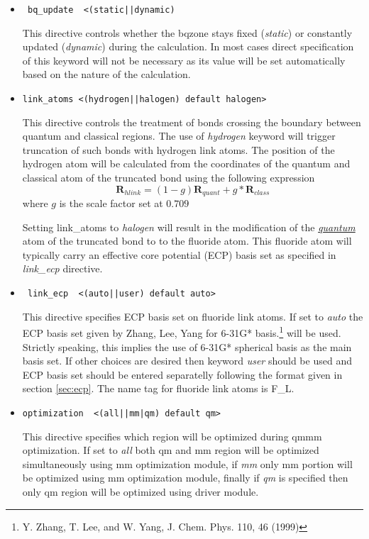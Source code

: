 \begin{itemize}
\item
\begin{verbatim}
 bq_update  <(static||dynamic)
\end{verbatim}
This directive controls whether the bqzone stays fixed ({\it static}) or constantly 
updated ({\it dynamic}) during the calculation. In most cases direct specification of this keyword
will not be necessary as its value will be set automatically based on the nature of the calculation.

\item
\begin{verbatim}
link_atoms <(hydrogen||halogen) default halogen>
\end{verbatim}

This directive controls the treatment of bonds crossing the boundary between quantum and classical regions.
The use of {\it hydrogen } keyword will trigger truncation of such bonds with hydrogen link atoms. The position of the hydrogen
atom will be calculated from the coordinates of the quantum and classical atom of the truncated bond using the
following expression
\begin{displaymath}
\mathbf{R}_{hlink} = (1-g)\mathbf{R}_{quant} + g*\mathbf{R}_{class}
\end{displaymath}
where $g$ is the scale factor set at $0.709$

Setting link{\_}atoms to {\it halogen } will result in the modification of the {\it \underline{quantum}} 
atom of the truncated bond to 
to the fluoride atom. This fluoride atom will typically carry an effective core potential (ECP) basis set as specified
in {\it link{\_}ecp} directive.

\item
\begin{verbatim}
 link_ecp  <(auto||user) default auto> 
\end{verbatim}
This directive specifies ECP basis set on fluoride link atoms. If set to {\it auto } 
the ECP basis set given by Zhang, Lee, Yang for 6-31G* basis.\footnote{Y. Zhang, T. Lee, and W. Yang, J. Chem. Phys. 110, 46 (1999)} 
will be used. Strictly speaking, this implies the use of 6-31G* spherical basis as the main basis set. 
If other choices are desired then keyword {\it user } should be used and ECP basis set should be entered separatelly 
following the format given in
section \ref{sec:ecp}. 
The name tag for fluoride link atoms is F{\_}L. 

\item
\begin{verbatim}
optimization  <(all||mm|qm) default qm>
\end{verbatim}

This directive specifies which region will be optimized during qmmm optimization. If set to {\it all} both qm and mm
region will be optimized simultaneously using mm optimization module, if {\it mm} only mm portion will be optimized
using mm optimization module, finally if {\it qm} is specified then only qm region will be optimized using driver
module. 

 

\end{itemize}



